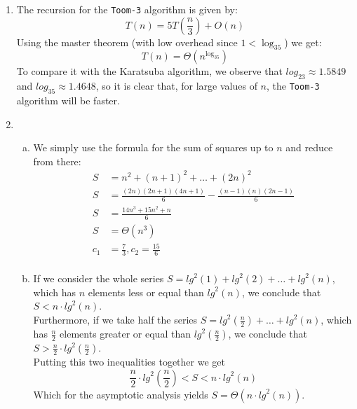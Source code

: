 \documentclass{article}
\begin{document}
\begin{enumerate}[1.]
    \item The recursion for the \texttt{Toom-3} algorithm is given by:
    \begin{equation*}
        T(n) = 5T\left(\frac{n}{3}\right) + O(n)
    \end{equation*}
    Using the master theorem (with low overhead since $1 < \log_35$) we get:
    \begin{equation*}
        T(n) = \Theta(n^{\log_35})
    \end{equation*}
    \newline
    To compare it with the Karatsuba algorithm, we observe that $log_23 \approx 1.5849$ and $log_35 \approx 1.4648$, so it is clear that, for large values of $n$, the \texttt{Toom-3} algorithm will be faster.
    
    \item
    \begin{enumerate}[(a)]
        \item We simply use the formula for the sum of squares up to $n$ and reduce from there:
        \begin{align*}
            S &= n^2 + (n+1)^2 + \ldots + (2n)^2\\
            S &= \frac{(2n)(2n+1)(4n+1)}{6} - \frac{(n-1)(n)(2n-1)}{6}\\
            S &= \frac{14 n^3 + 15 n^2 + n}{6}\\
            S &= \Theta(n^3)\\
            c_1 &= \frac{7}{3}, c_2 = \frac{15}{6}\\
        \end{align*}
        \item If we consider the whole series $S = \textit{lg}^2(1) + \textit{lg}^2(2) + \ldots + \textit{lg}^2(n)$, which has $n$ elements less or equal than $\textit{lg}^2(n)$, we conclude that $S < n\cdot \textit{lg}^2(n)$.\\
        Furthermore, if we take half the series $S = \textit{lg}^2(\frac{n}{2}) + \ldots + \textit{lg}^2(n)$, which has $\frac{n}{2}$ elements greater or equal than $\textit{lg}^2(\frac{n}{2})$, we conclude that $S > \frac{n}{2}\cdot \textit{lg}^2(\frac{n}{2})$.\\
        Putting this two inequalities together we get 
        \begin{equation*}
            \frac{n}{2}\cdot \textit{lg}^2\left(\frac{n}{2}\right) < S < n\cdot \textit{lg}^2(n)
        \end{equation*}
        Which for the asymptotic analysis yields $S = \Theta(n\cdot \textit{lg}^2(n))$.\\

\end{enumerate}
\end{enumerate}
\end{document}
